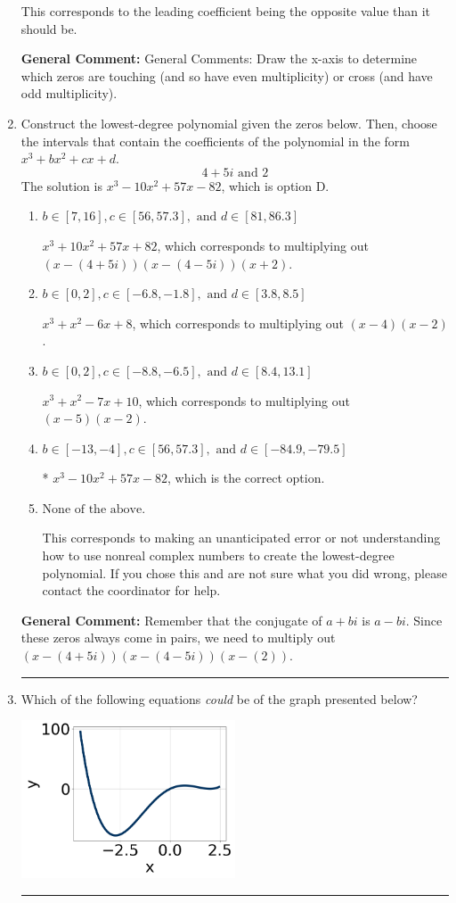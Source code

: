 \documentclass{extbook}[14pt]
\newcommand{\litem}[1]{\item #1

\rule{\textwidth}{0.4pt}}
\begin{document}
\begin{enumerate}
{\begin{enumerate}[label=\Alph*.]
This corresponds to the leading coefficient being the opposite value than it should be.
\end{enumerate}

\textbf{General Comment:} General Comments: Draw the x-axis to determine which zeros are touching (and so have even multiplicity) or cross (and have odd multiplicity).
}
\litem{
Construct the lowest-degree polynomial given the zeros below. Then, choose the intervals that contain the coefficients of the polynomial in the form $x^3+bx^2+cx+d$.
\[ 4 + 5 i \text{ and } 2 \]The solution is \( x^{3} -10 x^{2} +57 x -82 \), which is option D.\begin{enumerate}[label=\Alph*.]
\item \( b \in [7, 16], c \in [56, 57.3], \text{ and } d \in [81, 86.3] \)

$x^{3} +10 x^{2} +57 x + 82$, which corresponds to multiplying out $(x-(4 + 5 i))(x-(4 - 5 i))(x + 2)$.
\item \( b \in [0, 2], c \in [-6.8, -1.8], \text{ and } d \in [3.8, 8.5] \)

$x^{3} + x^{2} -6 x + 8$, which corresponds to multiplying out $(x -4)(x -2)$.
\item \( b \in [0, 2], c \in [-8.8, -6.5], \text{ and } d \in [8.4, 13.1] \)

$x^{3} + x^{2} -7 x + 10$, which corresponds to multiplying out $(x -5)(x -2)$.
\item \( b \in [-13, -4], c \in [56, 57.3], \text{ and } d \in [-84.9, -79.5] \)

* $x^{3} -10 x^{2} +57 x -82$, which is the correct option.
\item \( \text{None of the above.} \)

This corresponds to making an unanticipated error or not understanding how to use nonreal complex numbers to create the lowest-degree polynomial. If you chose this and are not sure what you did wrong, please contact the coordinator for help.
\end{enumerate}

\textbf{General Comment:} Remember that the conjugate of $a+bi$ is $a-bi$. Since these zeros always come in pairs, we need to multiply out $(x-(4 + 5 i))(x-(4 - 5 i))(x-(2))$.
}
\litem{
Which of the following equations \textit{could} be of the graph presented below?

\begin{center}
    \includegraphics[width=0.5\textwidth]{../Figures/polyGraphToFunctionCopyA.png}
\end{center}


}
\end{enumerate}
\end{document}
